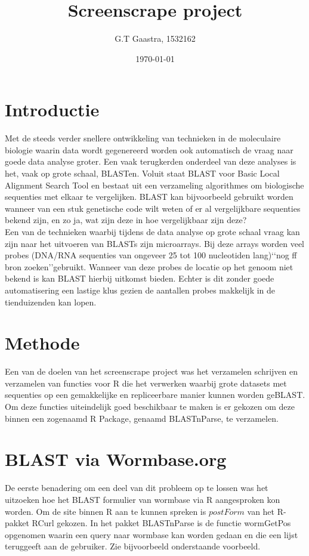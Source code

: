 \documentclass[a4paper]{article}
\title{Screenscrape project}
\author{G.T Gaastra, 1532162}
\date{\today}
\begin{document}
\maketitle

\section*{Introductie}
Met de steeds verder snellere ontwikkeling van technieken in de moleculaire biologie waarin data wordt gegenereerd worden ook automatisch de vraag naar goede data analyse groter. Een vaak terugkerden onderdeel van deze analyses is het, vaak op grote schaal, BLASTen. Voluit staat BLAST voor Basic Local Alignment Search Tool en bestaat uit een verzameling algorithmes om biologische sequenties met elkaar te vergelijken. BLAST kan bijvoorbeeld gebruikt worden wanneer van een stuk genetische code wilt weten of er al vergelijkbare sequenties bekend zijn, en zo ja, wat zijn deze in hoe vergelijkbaar zijn deze?\\

Een van de technieken waarbij tijdens de data analyse op grote schaal vraag kan zijn naar het uitvoeren van BLASTs zijn microarrays. Bij deze arrays worden veel probes (DNA/RNA sequenties van ongeveer 25 tot 100 nucleotiden lang)\lq\lq nog ff bron zoeken\rq\rq gebruikt. Wanneer van deze probes de locatie op het genoom niet bekend is kan BLAST hierbij uitkomst bieden. Echter is dit zonder goede automatisering een lastige klus gezien de aantallen probes makkelijk in de tienduizenden kan lopen. 
\section*{Methode}
Een van de doelen van het screenscrape project was het verzamelen schrijven en verzamelen van functies voor R\cite{Rcran} die het verwerken waarbij grote datasets met sequenties op een gemakkelijke en repliceerbare manier kunnen worden geBLAST.  Om deze functies uiteindelijk goed beschikbaar te maken is er gekozen om deze binnen een zogenaamd R Package, genaamd BLASTnParse, te verzamelen.
\section*{BLAST via Wormbase.org}
De eerste benadering om een deel van dit probleem op te lossen was het uitzoeken hoe het BLAST formulier van wormbase\cite{Wormbase} via R aangesproken kon worden. Om de site binnen R aan te kunnen spreken is $postForm$ van het R-pakket RCurl\cite{RCurl} gekozen. In het pakket BLASTnParse is de functie wormGetPos opgenomen waarin een query naar wormbase kan worden gedaan en die een lijst teruggeeft aan de gebruiker. Zie bijvoorbeeld onderstaande voorbeeld.
\end{document}
